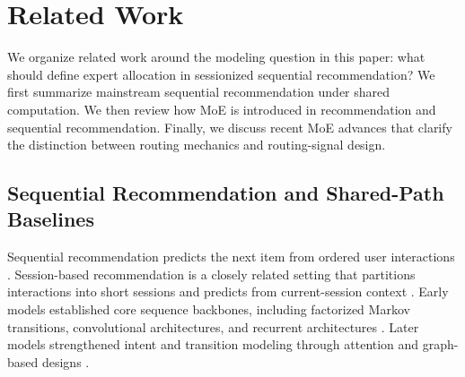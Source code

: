 \documentclass[sigconf,review,anonymous]{acmart}
\begin{document}


\section{Related Work}
\label{sec:related}

\noindent We organize related work around the modeling question in this paper: what should define expert allocation in sessionized sequential recommendation? We first summarize mainstream sequential recommendation under shared computation. We then review how MoE is introduced in recommendation and sequential recommendation. Finally, we discuss recent MoE advances that clarify the distinction between routing mechanics and routing-signal design.

\subsection{Sequential Recommendation and Shared-Path Baselines}
Sequential recommendation predicts the next item from ordered user interactions \cite{wang2019seqsurvey}. Session-based recommendation is a closely related setting that partitions interactions into short sessions and predicts from current-session context \cite{jannach2022sessions,wang2021sessionsurvey}. Early models established core sequence backbones, including factorized Markov transitions, convolutional architectures, and recurrent architectures \cite{rendle2010fpmc,tang2018caser,hidasi2016gru4rec}. Later models strengthened intent and transition modeling through attention and graph-based designs \cite{li2017narm,liu2018stamp,wu2019srgnn}.
\end{document}
